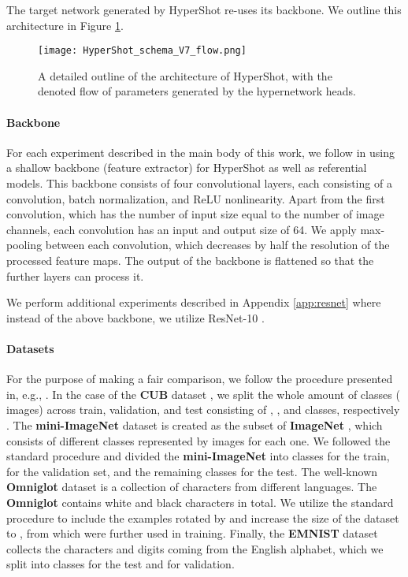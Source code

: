 \documentclass[nohyperref]{article}
\def\our{HyperShot}
\theoremstyle{plain}
\theoremstyle{definition}
\theoremstyle{remark}
\begin{document}
    The target network generated by \our{} re-uses its backbone. We outline this architecture in Figure \ref{fig:schema_flow}.
    
    \begin{figure}
        \centering
        \texttt{[image: HyperShot\_schema\_V7\_flow.png]}
        \caption{A detailed outline of the architecture of \our{}, with the denoted flow of parameters generated by the hypernetwork heads.
        }
        \label{fig:schema_flow}
    \end{figure}
    
\paragraph{Backbone}
    For each experiment described in the main body of this work, we follow  \cite{patacchiola2020bayesian} in using a shallow backbone (feature extractor) for \our{} as well as referential models. This backbone consists of four convolutional layers, each consisting of a convolution, batch normalization, and ReLU nonlinearity. Apart from the first convolution, which has the number of input size equal to the number of image channels, each convolution has an input and output size of 64. We apply max-pooling between each convolution, which decreases by half the resolution of the processed feature maps. The output of the backbone is flattened so that the further layers can process it.
    
    We perform additional experiments described in Appendix \ref{app:resnet} where instead of the above backbone, we utilize ResNet-10 \cite{he2015resnet}.
    
\paragraph{Datasets}
    For the purpose of making a fair comparison, we follow the procedure presented in, e.g., \cite{patacchiola2020bayesian,chen2019closer}. In the case of the \textbf{CUB} dataset \cite{wah2011cub}, we split the whole amount of  classes ( images) across train, validation, and test consisting of , , and  classes, respectively \cite{chen2019closer}. The \textbf{mini-ImageNet} dataset \cite{ravi2016optimization} is created as the subset of \textbf{ImageNet} \cite{russakovsky2015imagenet}, which consists of  different classes represented by  images for each one. We followed the standard procedure and divided the \textbf{mini-ImageNet} into  classes for the train,  for the validation set, and the remaining  classes for the test. The well-known \textbf{Omniglot} dataset \cite{lake2011one} is a collection of characters from  different languages. The \textbf{Omniglot} contains  white and black characters in total. We utilize the standard procedure to include the examples rotated by  and increase the size of the dataset to , from which  were further used in training. Finally, the \textbf{EMNIST} dataset \cite{cohen2017emnist} collects the characters and digits coming from the English alphabet, which we split into  classes for the test and  for validation.
    
\end{document}
